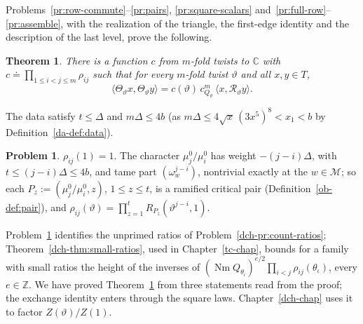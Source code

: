 \documentclass[reqno]{amsart}
\newcounter{chap}
\theoremstyle{definition}
\newtheorem{problem}{Problem}[section]
\theoremstyle{plain}
\newtheorem{theorem}{Theorem}[section]
\newcommand{\Z}{\mathbb Z}
\newcommand{\C}{\mathbb C}
\newcommand{\Nm}{\operatorname{Nm}}
\newcommand{\Rc}{\mathcal R}
\newcommand{\cM}{\mathcal M}
\begin{document}
Problems~\ref{pr:row-commute}--\ref{pr:pairs}, \ref{pr:square-scalars} and~\ref{pr:full-row}--\ref{pr:assemble}, with the realization of the triangle, the first-edge identity and the description of the last level, prove the following.

\begin{theorem}\label{thm:chain-gram}
There is a function \(c\) from \(m\)-fold twists to \(\C\) with \(c \doteq \prod_{1 \le i < j \le m}\rho_{ij}\) such that for every \(m\)-fold twist \(\vartheta\) and all \(x, y \in T\),
\[
  \langle \Theta_\vartheta x, \Theta_\vartheta y\rangle = c(\vartheta)\,c_{Q_\vartheta}^m\,\langle x, \Rc_\vartheta y\rangle .
\]
\end{theorem}

The data satisfy \(t \le \Delta\) and \(m\Delta \le 4b\) (as \(m\Delta \le 4\sqrt x\,(3x^5)^8 < x_1 < b\) by Definition~\ref{da-def:data}).

\begin{problem}\label{pr:rho-pair}
\(\rho_{ij}(1) = 1\).  The character \(\mu_j^0/\mu_i^0\) has weight \(-(j-i)\Delta\), with \(t \le (j-i)\Delta \le 4b\), and tame part \((\omega_w^{j-i})\), nontrivial exactly at the \(w \in \cM\); so each \(P_z := (\mu_j^0/\mu_i^0, z)\), \(1 \le z \le t\), is a ramified critical pair (Definition~\ref{ob-def:pair}), and \(\rho_{ij}(\vartheta) = \prod_{z=1}^t R_{P_z}(\vartheta^{j-i}, 1)\).
\end{problem}

Problem~\ref{pr:rho-pair} identifies the unprimed ratios of Problem~\ref{dch-pr:count-ratios}; Theorem~\ref{dch-thm:small-ratios}, used in Chapter~\ref{tc-chap}, bounds for a family with small ratios the height of the inverses of \((\Nm Q_{\theta_\iota})^{e/2}\prod_{i<j}\rho_{ij}(\theta_\iota)\), every \(e \in \Z\).  We have proved Theorem~\ref{thm:chain-gram} from three statements read from the proof; the exchange identity enters through the square laws.  Chapter~\ref{dch-chap} uses it to factor \(Z(\vartheta)/Z(1)\).
\end{document}
